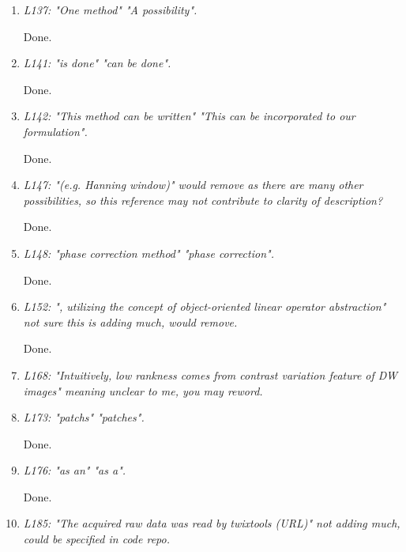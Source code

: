 \documentclass[a4paper,11pt,twoside]{report}
\begin{document}
\begin{enumerate}[resume]
    \item \textit{L137: "One method" \textrightarrow "A possibility".}

    \hspace{1em} Done.

    \item \textit{L141: "is done" \textrightarrow "can be done".}

    \hspace{1em} Done.

    \item \textit{L142: "This method can be written" \textrightarrow "This can be incorporated to our formulation".}

    \hspace{1em} Done.

    \item \textit{L147: "(e.g. Hanning window)" \textrightarrow would remove as there are many other possibilities, so this reference may not contribute to clarity of description?}

    \hspace{1em} Done.

    \item \textit{L148: "phase correction method" \textrightarrow "phase correction".}

    \hspace{1em} Done.

    \item \textit{L152: ", utilizing the concept of object-oriented linear operator abstraction" \textrightarrow not sure this is adding much, would remove.}

    \hspace{1em} Done.

    \item \textit{L168: "Intuitively, low rankness comes from contrast variation feature of DW images" \textrightarrow meaning unclear to me, you may reword.}

    \item \textit{L173: "patchs" \textrightarrow "patches".}

    \hspace{1em} Done.

    \item \textit{L176: "as an" \textrightarrow "as a".}

    \hspace{1em} Done.

    \item \textit{L185: "The acquired raw data was read by twixtools (URL)" \textrightarrow not adding much, could be specified in code repo.}


\end{enumerate}
\end{document}
